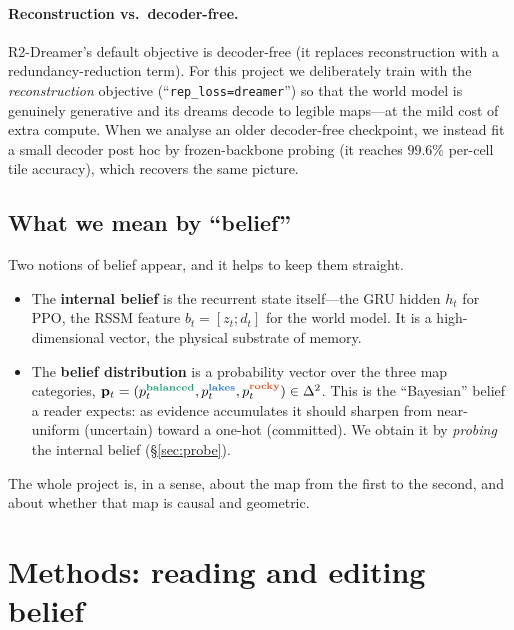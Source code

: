 \documentclass[11pt]{article}
\newcommand{\code}[1]{\texttt{\small #1}}
\newcommand{\lakes}{\textcolor{lakes}{\textbf{lakes}}}
\newcommand{\rocky}{\textcolor{rocky}{\textbf{rocky}}}
\newcommand{\balanced}{\textcolor{balanced}{\textbf{balanced}}}
\begin{document}
\paragraph{Reconstruction vs.\ decoder-free.} R2-Dreamer's default objective is
decoder-free (it replaces reconstruction with a redundancy-reduction term). For
this project we deliberately train with the \emph{reconstruction} objective
(``\code{rep\_loss=dreamer}'') so that the world model is genuinely generative
and its dreams decode to legible maps---at the mild cost of extra compute. When
we analyse an older decoder-free checkpoint, we instead fit a small decoder
post hoc by frozen-backbone probing (it reaches $99.6\%$ per-cell tile accuracy),
which recovers the same picture.

\subsection{What we mean by ``belief''}
Two notions of belief appear, and it helps to keep them straight.
\begin{itemize}[nosep]
\item The \textbf{internal belief} is the recurrent state itself---the GRU hidden
$h_t$ for PPO, the RSSM feature $b_t=[z_t;d_t]$ for the world model. It is a
high-dimensional vector, the physical substrate of memory.
\item The \textbf{belief distribution} is a probability vector over the three map
categories, $\mathbf{p}_t = (p_t^{\balanced}, p_t^{\lakes}, p_t^{\rocky})\in
\Delta^2$. This is the ``Bayesian'' belief a reader expects: as evidence
accumulates it should sharpen from near-uniform (uncertain) toward a one-hot
(committed). We obtain it by \emph{probing} the internal belief
(\S\ref{sec:probe}).
\end{itemize}
The whole project is, in a sense, about the map from the first to the second, and
about whether that map is causal and geometric.

\section{Methods: reading and editing belief}
\label{sec:methods}
\end{document}
